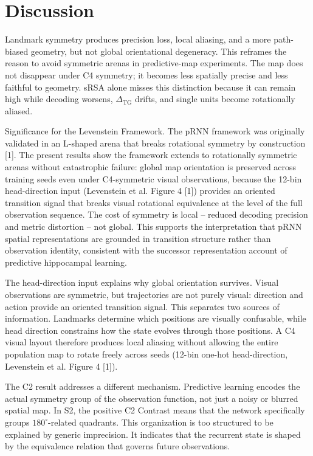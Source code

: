 ﻿\documentclass[10pt]{article}
\begin{document}
\section{Discussion}

Landmark symmetry produces precision loss, local aliasing, and a more path-biased geometry, but not global orientational degeneracy. This reframes the reason to avoid symmetric arenas in predictive-map experiments. The map does not disappear under C4 symmetry; it becomes less spatially precise and less faithful to geometry. sRSA alone misses this distinction because it can remain high while decoding worsens, $\Delta_{\mathrm{TG}}$ drifts, and single units become rotationally aliased.

Significance for the Levenstein Framework. The pRNN framework was originally validated in an L-shaped arena that breaks rotational symmetry by construction [1]. The present results show the framework extends to rotationally symmetric arenas without catastrophic failure: global map orientation is preserved across training seeds even under C4-symmetric visual observations, because the 12-bin head-direction input (Levenstein et al. Figure 4 [1]) provides an oriented transition signal that breaks visual rotational equivalence at the level of the full observation sequence. The cost of symmetry is local -- reduced decoding precision and metric distortion -- not global. This supports the interpretation that pRNN spatial representations are grounded in transition structure rather than observation identity, consistent with the successor representation account of predictive hippocampal learning.

The head-direction input explains why global orientation survives. Visual observations are symmetric, but trajectories are not purely visual: direction and action provide an oriented transition signal. This separates two sources of information. Landmarks determine which positions are visually confusable, while head direction constrains how the state evolves through those positions. A C4 visual layout therefore produces local aliasing without allowing the entire population map to rotate freely across seeds (12-bin one-hot head-direction, Levenstein et al. Figure 4 [1]).

The C2 result addresses a different mechanism. Predictive learning encodes the actual symmetry group of the observation function, not just a noisy or blurred spatial map. In S2, the positive C2 Contrast means that the network specifically groups $180^\circ$-related quadrants. This organization is too structured to be explained by generic imprecision. It indicates that the recurrent state is shaped by the equivalence relation that governs future observations.
\end{document}
